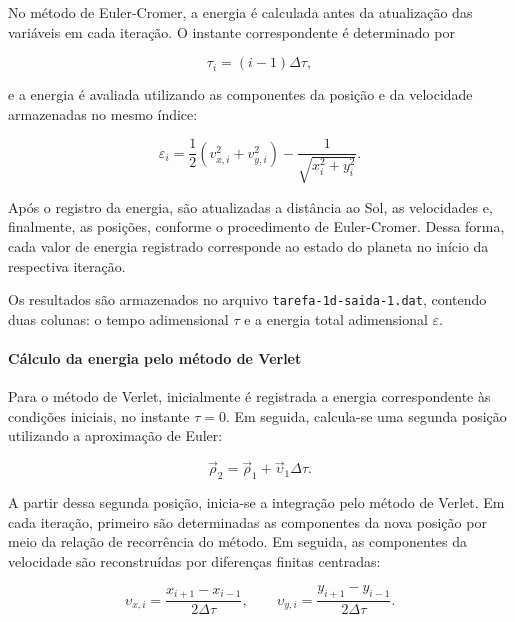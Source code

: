 \documentclass[12pt,a4paper]{article}
\begin{document}
No método de Euler-Cromer, a energia é calculada antes da atualização das variáveis em cada iteração. O instante correspondente é determinado por

\begin{equation}
    \tau_i=(i-1)\Delta\tau,
\end{equation}

e a energia é avaliada utilizando as componentes da posição e da velocidade armazenadas no mesmo índice:

\begin{equation}
    \varepsilon_i=
    \frac{1}{2}\left(v_{x,i}^2+v_{y,i}^2\right)
    -\frac{1}{\sqrt{x_i^2+y_i^2}}.
\end{equation}

Após o registro da energia, são atualizadas a distância ao Sol, as velocidades e, finalmente, as posições, conforme o procedimento de Euler-Cromer. Dessa forma, cada valor de energia registrado corresponde ao estado do planeta no início da respectiva iteração.

Os resultados são armazenados no arquivo \texttt{tarefa-1d-saida-1.dat}, contendo duas colunas: o tempo adimensional $\tau$ e a energia total adimensional $\varepsilon$.

\paragraph{Cálculo da energia pelo método de Verlet}

Para o método de Verlet, inicialmente é registrada a energia correspondente às condições iniciais, no instante $\tau=0$. Em seguida, calcula-se uma segunda posição utilizando a aproximação de Euler:

\begin{equation}
    \vec{\rho}_2=\vec{\rho}_1+\vec{\upsilon}_1\Delta\tau.
\end{equation}

A partir dessa segunda posição, inicia-se a integração pelo método de Verlet. Em cada iteração, primeiro são determinadas as componentes da nova posição por meio da relação de recorrência do método. Em seguida, as componentes da velocidade são reconstruídas por diferenças finitas centradas:

\begin{equation}
    \upsilon_{x,i}=
    \frac{x_{i+1}-x_{i-1}}{2\Delta\tau},
    \qquad
    \upsilon_{y,i}=
    \frac{y_{i+1}-y_{i-1}}{2\Delta\tau}.
\end{equation}
\end{document}
